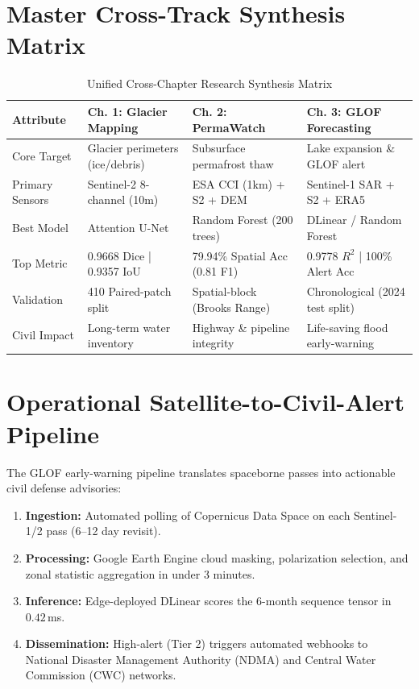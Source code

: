 \documentclass[12pt,a4paper]{report}
\begin{document}
\section{Master Cross-Track Synthesis Matrix}
\begin{table}[H]
\centering
\caption{Unified Cross-Chapter Research Synthesis Matrix}
\label{tab:cross_track_synthesis}
\small
\begin{tabularx}{\textwidth}{lXXX}
\toprule
\textbf{Attribute} & \textbf{Ch. 1: Glacier Mapping} & \textbf{Ch. 2: PermaWatch} & \textbf{Ch. 3: GLOF Forecasting} \\
\midrule
Core Target & Glacier perimeters (ice/debris) & Subsurface permafrost thaw & Lake expansion \& GLOF alert \\
Primary Sensors & Sentinel-2 8-channel (10m) & ESA CCI (1km) + S2 + DEM & Sentinel-1 SAR + S2 + ERA5 \\
Best Model & Attention U-Net & Random Forest (200 trees) & DLinear / Random Forest \\
Top Metric & 0.9668 Dice | 0.9357 IoU & 79.94\% Spatial Acc (0.81 F1) & 0.9778 $R^2$ | 100\% Alert Acc \\
Validation & 410 Paired-patch split & Spatial-block (Brooks Range) & Chronological (2024 test split) \\
Civil Impact & Long-term water inventory & Highway \& pipeline integrity & Life-saving flood early-warning \\
\bottomrule
\end{tabularx}
\end{table}

\section{Operational Satellite-to-Civil-Alert Pipeline}
The GLOF early-warning pipeline translates spaceborne passes into actionable civil defense advisories:
\begin{enumerate}
    \item \textbf{Ingestion:} Automated polling of Copernicus Data Space on each Sentinel-1/2 pass (6--12 day revisit).
    \item \textbf{Processing:} Google Earth Engine cloud masking, polarization selection, and zonal statistic aggregation in under 3 minutes.
    \item \textbf{Inference:} Edge-deployed DLinear scores the 6-month sequence tensor in $0.42$\,ms.
    \item \textbf{Dissemination:} High-alert (Tier 2) triggers automated webhooks to National Disaster Management Authority (NDMA) and Central Water Commission (CWC) networks.
\end{enumerate}
\end{document}

